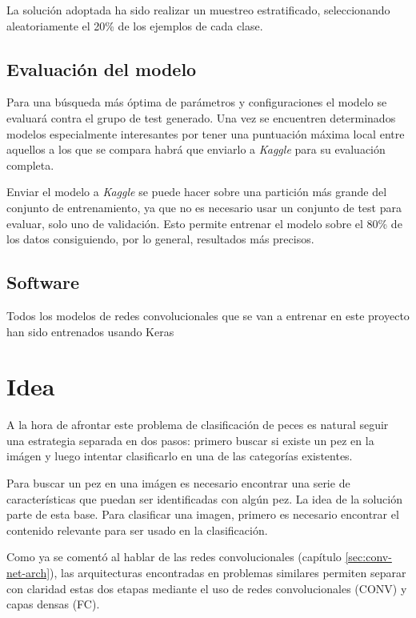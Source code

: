 La solución adoptada ha sido realizar un muestreo estratificado, seleccionando aleatoriamente el 20\% de los ejemplos de cada clase.

\subsection{Evaluación del modelo}

Para una búsqueda más óptima de parámetros y configuraciones el modelo se evaluará contra el grupo de test generado. Una vez se encuentren determinados modelos especialmente interesantes por tener una puntuación máxima local entre aquellos a los que se compara habrá que enviarlo a \textit{Kaggle} para su evaluación completa.

Enviar el modelo a \textit{Kaggle} se puede hacer sobre una partición más grande del conjunto de entrenamiento, ya que no es necesario usar un conjunto de test para evaluar, solo uno de validación. Esto permite entrenar el modelo sobre el 80\% de los datos consiguiendo, por lo general, resultados más precisos.



\subsection{Software}

Todos los modelos de redes convolucionales que se van a entrenar en este proyecto han sido entrenados usando Keras


\section{Idea}
A la hora de afrontar este problema de clasificación de peces es natural
seguir una estrategia separada en dos pasos: primero buscar si
existe un pez en la imágen y luego intentar clasificarlo en una de las
categorías existentes.

Para buscar un pez en una imágen es necesario encontrar una serie de
características que puedan ser identificadas con algún pez. La idea de
la solución parte de esta base. Para clasificar una imagen,
primero es necesario encontrar el contenido relevante para ser usado
en la clasificación.

Como ya se comentó al hablar de las redes convolucionales (capítulo \ref{sec:conv-net-arch}),
las arquitecturas encontradas en problemas similares \parencite{krizhevsky2012imagenet}
permiten separar con claridad estas dos etapas mediante el uso de redes convolucionales (CONV) y capas densas (FC).

